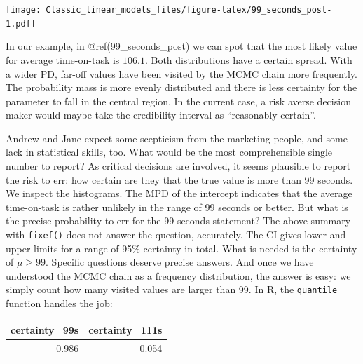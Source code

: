 \documentclass[]{svmono}
\newenvironment{Shaded}{\begin{snugshade}}{\end{snugshade}}
\newcommand{\KeywordTok}[1]{\textcolor[rgb]{0.13,0.29,0.53}{\textbf{#1}}}
\newcommand{\DataTypeTok}[1]{\textcolor[rgb]{0.13,0.29,0.53}{#1}}
\newcommand{\DecValTok}[1]{\textcolor[rgb]{0.00,0.00,0.81}{#1}}
\newcommand{\StringTok}[1]{\textcolor[rgb]{0.31,0.60,0.02}{#1}}
\newcommand{\OperatorTok}[1]{\textcolor[rgb]{0.81,0.36,0.00}{\textbf{#1}}}
\newcommand{\NormalTok}[1]{#1}
\theoremstyle{definition}
\theoremstyle{definition}
\theoremstyle{definition}
\theoremstyle{remark}
\begin{document}
\texttt{[image: Classic\_linear\_models\_files/figure-latex/99\_seconds\_post-1.pdf]}

In our example, in @ref(99\_seconds\_post) we can spot that the most
likely value for average time-on-task is \(106.1\). Both distributions
have a certain spread. With a wider PD, far-off values have been visited
by the MCMC chain more frequently. The probability mass is more evenly
distributed and there is less certainty for the parameter to fall in the
central region. In the current case, a risk averse decision maker would
maybe take the credibility interval as ``reasonably certain''.

Andrew and Jane expect some scepticism from the marketing people, and
some lack in statistical skills, too. What would be the most
comprehensible single number to report? As critical decisions are
involved, it seems plausible to report the risk to err: how certain are
they that the true value is more than 99 seconds. We inspect the
histograms. The MPD of the intercept indicates that the average
time-on-task is rather unlikely in the range of 99 seconds or better.
But what is the precise probability to err for the 99 seconds statement?
The above summary with \texttt{fixef()} does not answer the question,
accurately. The CI gives lower and upper limits for a range of 95\%
certainty in total. What is needed is the certainty of \(\mu \geq 99\).
Specific questions deserve precise answers. And once we have understood
the MCMC chain as a frequency distribution, the answer is easy: we
simply count how many visited values are larger than 99. In R, the
\texttt{quantile} function handles the job:

\begin{Shaded}
\end{Shaded}

\begin{tabular}{r|r}
\hline
certainty\_99s & certainty\_111s\\
\hline
0.986 & 0.054\\
\hline
\end{tabular}
\end{document}
